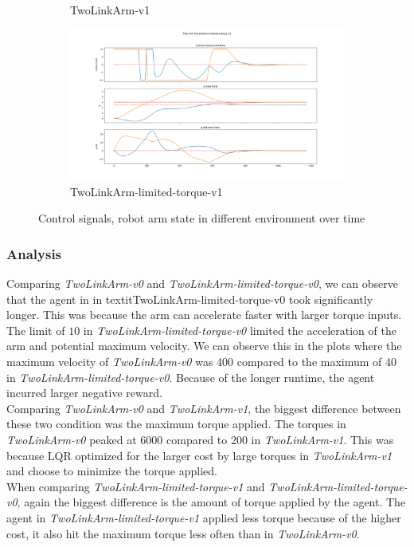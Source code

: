 \documentclass[hidelinks]{scrartcl}
\begin{document}
\begin{figure}[H]
\begin{subfigure}[b]{0.45\textwidth}
        \caption{TwoLinkArm-v1}
    \end{subfigure}
    \begin{subfigure}[b]{0.45\textwidth}
        \includegraphics[width=\textwidth]{figures/twolinkarm-limited-v1}
        \caption{TwoLinkArm-limited-torque-v1}
    \end{subfigure}
    \caption{Control signals, robot arm state in different environment over time}\label{fig:LQR_state}
\end{figure}
\subsubsection*{Analysis}
Comparing \textit{TwoLinkArm-v0} and \textit{TwoLinkArm-limited-torque-v0}, we can observe that the agent in in textit{TwoLinkArm-limited-torque-v0} took significantly longer. This was because the arm can accelerate faster with larger torque inputs. The limit of $10$ in \textit{TwoLinkArm-limited-torque-v0} limited the acceleration of the arm and potential maximum velocity. We can observe this in the plots where the maximum velocity of \textit{TwoLinkArm-v0} was 400 compared to the maximum of 40 in \textit{TwoLinkArm-limited-torque-v0}. Because of the longer runtime, the agent incurred larger negative reward.\\
Comparing \textit{TwoLinkArm-v0} and \textit{TwoLinkArm-v1}, the biggest difference between these two condition was the maximum torque applied. The torques in \textit{TwoLinkArm-v0} peaked at 6000 compared to 200 in \textit{TwoLinkArm-v1}. This was because LQR optimized for the larger cost by large torques in \textit{TwoLinkArm-v1} and choose to minimize the torque applied.\\
When comparing \textit{TwoLinkArm-limited-torque-v1} and \textit{TwoLinkArm-limited-torque-v0}, again the biggest difference is the amount of torque applied by the agent. The agent in \textit{TwoLinkArm-limited-torque-v1} applied less torque because of the higher cost, it also hit the maximum torque less often than in \textit{TwoLinkArm-v0}.
\end{document}
